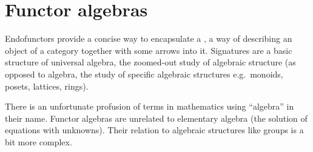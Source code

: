 \documentclass[a5paper]{article}
\newcommand{\dual}[2]{
  \begin{itemize}\renewcommand{\labelitemi}{$\circ $}
    \itemsep0em
    \item #1
    \item #2
   \end{itemize}
}
\begin{document}
\section{Functor algebras}
\label{sec:functors-and-their-algebras}


Endofunctors provide a concise way to encapsulate a
, a way of describing an object of a
category together with some arrows into it. Signatures are a basic structure
of universal algebra, the zoomed-out study of algebraic structure (as opposed to
algebra, the study of specific algebraic structures e.g.\ monoids, posets,
lattices, rings).


There is an unfortunate profusion of terms in mathematics using ``algebra'' in
their name. Functor algebras are unrelated to elementary algebra (the
solution of equations with unknowns). Their relation to
algebraic structures like groups is a bit more complex.
\end{document}
